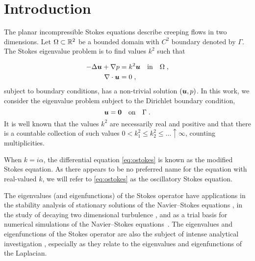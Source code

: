\section{Introduction}

The planar incompressible Stokes equations describe
creeping flows in two dimensions.
%
Let $\Omega \subset \mathbb{R}^2$
be a bounded domain with $C^2$ boundary denoted by $\Gamma$.
%
The Stokes eigenvalue problem is to find
values $k^2$ such that 

\begin{equation}
\begin{aligned}
  -\Delta {\boldsymbol u} + \nabla p &= k^2 {\boldsymbol u} \quad \textrm{in} \quad
  \Omega \label{eq:ostokes} \; , \\
  \nabla \cdot {\boldsymbol u} &= 0 \; ,
\end{aligned}
\end{equation}
subject to boundary conditions, has a non-trivial solution $({\boldsymbol u},p)$.
%
In this work, we consider the eigenvalue problem subject to 
the Dirichlet boundary condition,
\begin{equation}
  {\boldsymbol u} = {\boldsymbol 0} \quad \textrm{on} \quad \Gamma \label{eq:ostokes_dir} \; .
\end{equation}
It is well known that the values $k^2$ are necessarily
real and positive and that there is a countable collection of such
values $0 < k_{1}^{2} \leq k_{2}^2 \leq \ldots \uparrow \infty$,
counting multiplicities.

\begin{remark}
  When $k = i\alpha$, the differential equation
  \cref{eq:ostokes} is known as the modified Stokes
  equation. As there appears to be no preferred
  name for the equation with real-valued $k$,
  we will refer to \cref{eq:ostokes} as the
  oscillatory Stokes equation.
\end{remark}

The eigenvalues (and eigenfunctions)
of the Stokes operator have applications in the
stability analysis of stationary solutions of the
Navier--Stokes equations \cite{osborn1976approximation},
in the study of decaying two dimensional turbulence
\cite{schneider2008final}, and as a trial basis for
numerical simulations of the Navier--Stokes
equations~\cite{batcho1994generalized}.
%
The eigenvalues and eigenfunctions of the Stokes
operator are also the subject of intense analytical
investigation
\cite{taylor1933buckling,szego1950membranes,
  polya1951isoperimetric,bramble1963pointwise,
  ashbaugh1996fundamental,leriche2004stokes,
  kelliher2009eigenvalues,antunes2011buckling},
especially as they relate to the eigenvalues and
eigenfunctions of the Laplacian.

